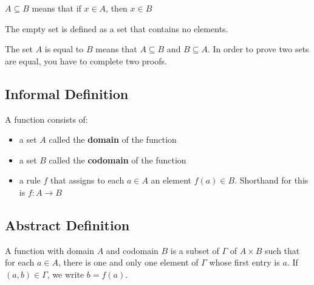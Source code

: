 $A \subseteq B$ means that if $x \in A$, then $x \in B$

The empty set is defined as a set that contains no elements.

The set $A$ is equal to $B$ means that $A \subseteq B$ and $B \subseteq A$. In order to prove two sets are equal, you have to complete two proofs.

\subsection*{\textbf{Informal Definition}}
A function consists of:
\begin{itemize}
    \item a set $A$ called the \textbf{domain} of the function
    \item a set $B$ called the \textbf{codomain} of the function
    \item a rule $f$ that assigns to each $a \in A$ an element $f(a) \in B$. Shorthand for this is $f : A \rightarrow B$
\end{itemize}
\subsection*{\textbf{Abstract Definition}}
A function with domain $A$ and codomain $B$ is a subset of $\Gamma$ of $A \times B$ such that for each $a \in A$, there is one and only one element of $\Gamma$ whose first entry is $a$. If $(a,b) \in \Gamma$, we write $b = f(a)$.

